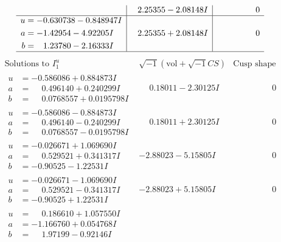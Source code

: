 \documentclass[1p]{elsarticle_modified}
\theoremstyle{definition}
\newcommand{\I}{\sqrt{-1}}
\begin{document}
$$\begin{array}{c|c|c}
 & \phantom{-}2.25355 - 2.08148 I & \phantom{-0.000000 } 0 \\ \hline\begin{aligned}
u &= -0.630738 - 0.848947 I \\
a &= -1.42954 - 4.92205 I \\
b &= \phantom{-}1.23780 - 2.16333 I\end{aligned}
 & \phantom{-}2.25355 + 2.08148 I & \phantom{-0.000000 } 0\\
 \hline 
 \end{array}$$\newpage$$\begin{array}{c|c|c}  
\text{Solutions to }I^u_{1}& \I (\text{vol} + \sqrt{-1}CS) & \text{Cusp shape}\\
 \hline 
\begin{aligned}
u &= -0.586086 + 0.884873 I \\
a &= \phantom{-}0.496140 + 0.240299 I \\
b &= \phantom{-}0.0768557 + 0.0195798 I\end{aligned}
 & \phantom{-}0.18011 - 2.30125 I & \phantom{-0.000000 } 0 \\ \hline\begin{aligned}
u &= -0.586086 - 0.884873 I \\
a &= \phantom{-}0.496140 - 0.240299 I \\
b &= \phantom{-}0.0768557 - 0.0195798 I\end{aligned}
 & \phantom{-}0.18011 + 2.30125 I & \phantom{-0.000000 } 0 \\ \hline\begin{aligned}
u &= -0.026671 + 1.069690 I \\
a &= \phantom{-}0.529521 + 0.341317 I \\
b &= -0.90525 - 1.22531 I\end{aligned}
 & -2.88023 - 5.15805 I & \phantom{-0.000000 } 0 \\ \hline\begin{aligned}
u &= -0.026671 - 1.069690 I \\
a &= \phantom{-}0.529521 - 0.341317 I \\
b &= -0.90525 + 1.22531 I\end{aligned}
 & -2.88023 + 5.15805 I & \phantom{-0.000000 } 0 \\ \hline\begin{aligned}
u &= \phantom{-}0.186610 + 1.057550 I \\
a &= -1.166760 + 0.054768 I \\
b &= \phantom{-}1.97199 - 0.92146 I\end{aligned}

\end{array}$$
\end{document}
